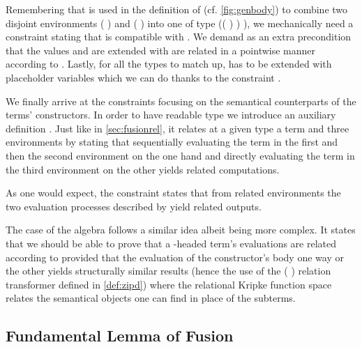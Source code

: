 
Remembering that \AF{\_>>\_} is used in the definition of  (cf. \cref{fig:genbody})
to combine two disjoint environments {( )  } and
{( )  } into one of type
{(( \AF{++} ) )  )}, we mechanically need a
constraint stating that \AF{\_>>\_} is compatible with . We demand
as an extra precondition that the values  and  are extended
with are related in a pointwise manner according to . Lastly, for all
the types to match up,  has to be extended with placeholder variables
which we can do thanks to the  constraint .


We finally arrive at the constraints focusing on the semantical counterparts
of the terms' constructors. In order to have readable type we introduce an
auxiliary definition . Just like in \cref{sec:fusionrel}, it relates at
a given type a term and three environments by stating that sequentially evaluating
the term in the first and then the second environment on the one hand and directly
evaluating the term in the third environment on the other yields related computations.


As one would expect, the  constraint states that from related environments
the two evaluation processes described by  yield related outputs.


The case of the algebra follows a similar idea albeit being more complex. It states
that we should be able to prove that a -headed term's evaluations are related
according to  provided that the evaluation of the constructor's body one way or
the other yields structurally similar results (hence the use of the ({ })
relation transformer defined in \cref{def:zipd}) where the relational Kripke function
space relates the semantical objects one can find in place of the subterms.


\subsection{Fundamental Lemma of Fusion}

